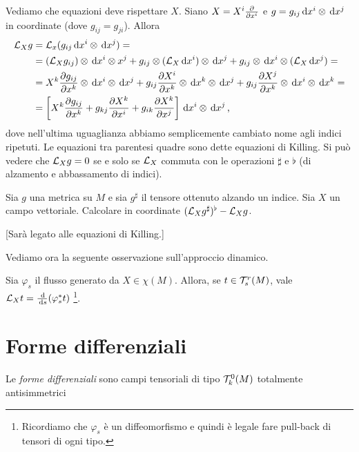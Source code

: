 \begin{example}
\begin{enumerate}
		Vediamo che equazioni deve rispettare $X$. Siano $X = X^i\frac{\partial }{\partial x^i}$ e $g = g_{ij}\,\mathrm d x^i \otimes \,\mathrm d x^j$ in coordinate (dove $g_{ij} = g_{ji}$).
		Allora
		\begin{align*}
		\mathcal L_Xg &= \mathcal L_x (g_{ij}\,\mathrm d x^i \otimes \,\mathrm d x^j) =\\
		&=(\mathcal L_Xg_{ij})\otimes \,\mathrm d x^i\otimes x^j + g_{ij} \otimes (\mathcal L_X\,\mathrm d x^i) \otimes \,\mathrm d x^j + g_{ij}\otimes \,\mathrm d x^i \otimes (\mathcal L_X\,\mathrm d x^j) =\\
		&= X^k \frac{\partial g_{ij}}{\partial x^k}\otimes \,\mathrm d x^i \otimes \,\mathrm d x^j + g_{ij}\frac{\partial X^i}{\partial x^k} \otimes \,\mathrm d x^k \otimes \,\mathrm d x^j + g_{ij} \frac{\partial X^j}{\partial x^k} \otimes \,\mathrm d x^i \otimes \,\mathrm d x^k =\\
		&= \left[X^k \frac{\partial g_{ij}}{\partial x^k} + g_{kj} \frac{\partial X^k}{\partial x^i} + g_{ik} \frac{\partial X^k}{\partial x^j} \right] \,\mathrm d x^i \otimes \,\mathrm d x^j \, \text{, }
		\end{align*}
		dove nell'ultima uguaglianza abbiamo semplicemente cambiato nome agli indici ripetuti. Le equazioni tra parentesi quadre sono dette equazioni di Killing. Si può vedere che $\mathcal L_Xg=0$ se e solo se $\mathcal L_X$ commuta con le operazioni $\sharp$ e $\flat$ (di alzamento e abbassamento di indici).
	\end{enumerate}
\end{example}

\begin{exercise}
	Sia $g$ una metrica su $M$ e sia $g^{\sharp}$ il tensore ottenuto alzando un indice. Sia $X$ un campo vettoriale. Calcolare in coordinate $(\mathcal L_X g^\sharp)^\flat - \mathcal L_X g$.
	
	[Sarà legato alle equazioni di Killing.]
\end{exercise}


Vediamo ora la seguente osservazione sull'approccio dinamico.
\begin{remark}
	Sia $\varphi_s$ il flusso generato da $X\in\chi(M)$. Allora, se $t\in\mathcal T_s^r(M)$, vale $\mathcal L_Xt = \frac{\,\mathrm d}{\,\mathrm d s} (\varphi_s^* t)$ \footnote{Ricordiamo che $\varphi_s$ è un diffeomorfismo e quindi è legale fare pull-back di tensori di ogni tipo.}.
\end{remark}


\chapter{Forme differenziali} %

\begin{definition} 
	Le \emph{forme differenziali} sono campi tensoriali di tipo $\mathcal T_k^0(M)$ totalmente antisimmetrici
\end{definition}

